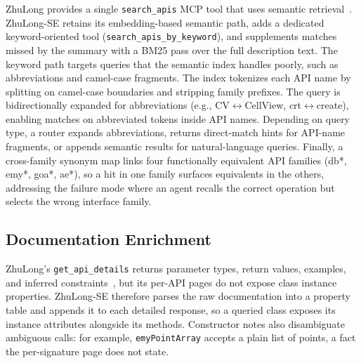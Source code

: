 ZhuLong provides a single \texttt{search\_apis} MCP tool that uses semantic retrieval~\cite{liu2026zhulong}. ZhuLong-SE retains its embedding-based semantic path, adds a dedicated keyword-oriented tool (\texttt{search\_apis\_by\_keyword}), and supplements matches missed by the summary with a BM25 pass over the full description text. The keyword path targets queries that the semantic index handles poorly, such as abbreviations and camel-case fragments. The index tokenizes each API name by splitting on camel-case boundaries and stripping family prefixes. The query is bidirectionally expanded for abbreviations (e.g., CV$\leftrightarrow$CellView, crt$\leftrightarrow$create), enabling matches on abbreviated tokens inside API names. Depending on query type, a router expands abbreviations, returns direct-match hints for API-name fragments, or appends semantic results for natural-language queries. Finally, a cross-family synonym map links four functionally equivalent API families (db*, emy*, goa*, ae*), so a hit in one family surfaces equivalents in the others, addressing the failure mode where an agent recalls the correct operation but selects the wrong interface family.

\subsection{Documentation Enrichment}
\label{sec:method_doc}

ZhuLong's \texttt{get\_api\_details} returns parameter types, return values, examples, and inferred constraints~\cite{liu2026zhulong}, but its per-API pages do not expose class instance properties. ZhuLong-SE therefore parses the raw documentation into a property table and appends it to each detailed response, so a queried class exposes its instance attributes alongside its methods. Constructor notes also disambiguate ambiguous calls: for example, \texttt{emyPointArray} accepts a plain list of points, a fact the per-signature page does not state.

